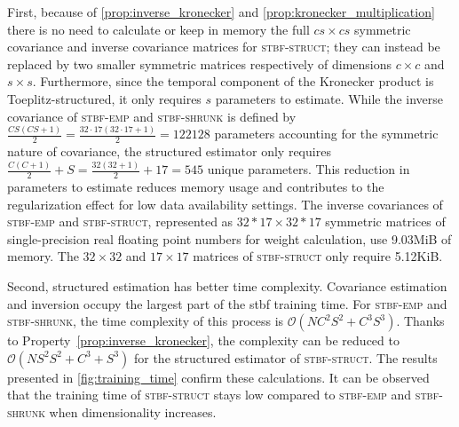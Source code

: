 	First, because of \cref{prop:inverse_kronecker} and
	\cref{prop:kronecker_multiplication} there is no need to calculate or keep in memory the full $cs\times cs$
	symmetric covariance and inverse covariance matrices for \textsc{stbf-struct}; they can instead be replaced by two smaller symmetric matrices respectively of dimensions $c\times c$ and $s\times s$.
	Furthermore, since the temporal component of the Kronecker product is
	Toeplitz-structured, it only requires $s$ parameters to
	estimate.
	While the inverse covariance of \textsc{stbf-emp} and \textsc{stbf-shrunk} is
	defined by $\frac{CS(CS+1)}{2}=\frac{32\cdot17(32\cdot17+1)}{2}=\num{122128}$
	parameters accounting for the symmetric nature of
	covariance, the structured estimator only requires $\frac{C(C+1)}{2} + S =
		\frac{32(32+1)}{2} + 17=545$ unique parameters.
	This reduction in parameters to estimate reduces memory usage and contributes to the regularization effect for low data availability settings.
	The inverse covariances of \textsc{stbf-emp} and
	\textsc{stbf-struct}, represented as $32*17\times 32*17$ symmetric matrices of
	single-precision real floating point numbers for weight calculation,
	use 9.03MiB of memory.
	The $32\times 32$ and $17\times 17$ matrices of \textsc{stbf-struct} only
	require 5.12KiB.

	Second, structured estimation has better time complexity.
	Covariance estimation and inversion occupy the largest part of the \ac{stbf} training time.
	For \textsc{stbf-emp} and \textsc{stbf-shrunk}, the time complexity of this process is $\mathcal{O}(NC^2S^2+C^3S^3)$.
	Thanks to Property~\ref{prop:inverse_kronecker}, the complexity can be reduced to
	$\mathcal{O}(NS^2S^2+C^3+S^3)$ for the structured estimator of \textsc{stbf-struct}.
	The results presented in \cref{fig:training_time} confirm these
	calculations.
	It can be observed that the training time of \textsc{stbf-struct} stays low compared to \textsc{stbf-emp} and \textsc{stbf-shrunk} when dimensionality increases.


